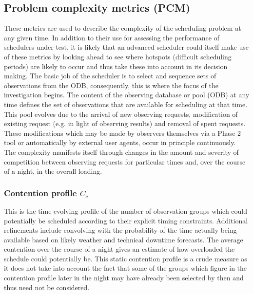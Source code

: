 \subsection{Problem complexity metrics (PCM)}
\label{ss:pcm}
These metrics are used to describe the complexity of the scheduling problem at any given time. In addition to their use for assessing the performance of schedulers under test, it is likely that an advanced scheduler could itself make use of these metrics by looking ahead to see where hotspots (difficult scheduling periods) are likely to occur and thus take these into account in its decision making.
 The basic job of the scheduler is to select and sequence sets of observations from the ODB, consequently, this is where the focus of the investigation begins. The content of the observing database or pool (ODB) at any time defines the set of observations that are available for scheduling at that time. This pool evolves due to the arrival of new observing requests, modification of existing request (e.g. in light of observing results) and removal of spent requests. These modifications which may be made by observers themselves via a Phase 2 tool or automatically by external user agents, occur in principle continuously. The complexity manifests itself through changes in the amount and severity of competition between observing requests for particular times and, over the course of a night, in the overall loading.


\subsubsection{Contention profile $C_c$}
 This is the time evolving profile of the number of observation groups which could potentially be scheduled according to their explicit timing constraints. Additional refinements include convolving with the probability of the time actually being available based on likely weather and technical downtime forecasts. The average contention over the course of a night gives an estimate of how overloaded the schedule could potentially be. This static contention profile is a crude measure as it does not take into account the fact that some of the groups which figure in the contention profile later in the night may have already been selected by then and thus need not be considered. 

